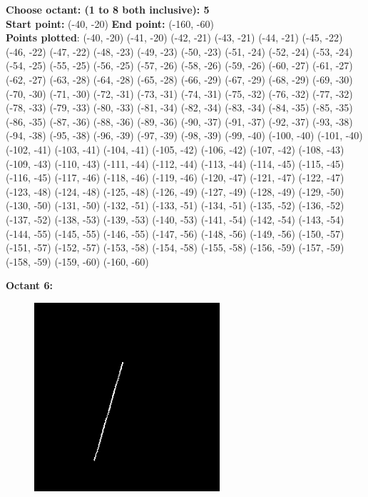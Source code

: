 \documentclass[12pt,letterpaper]{article}
\begin{document}
\textbf{Choose octant: (1 to 8 both inclusive): 5}\\
\textbf{Start point:} (-40, -20)
\textbf{End point:} (-160, -60)\\
\textbf{Points plotted}: 
(-40, -20) (-41, -20) (-42, -21) (-43, -21) 
(-44, -21) (-45, -22) (-46, -22) (-47, -22) 
(-48, -23) (-49, -23) (-50, -23) (-51, -24) 
(-52, -24) (-53, -24) (-54, -25) (-55, -25) 
(-56, -25) (-57, -26) (-58, -26) (-59, -26) 
(-60, -27) (-61, -27) (-62, -27) (-63, -28) 
(-64, -28) (-65, -28) (-66, -29) (-67, -29) 
(-68, -29) (-69, -30) (-70, -30) (-71, -30) 
(-72, -31) (-73, -31) (-74, -31) (-75, -32) 
(-76, -32) (-77, -32) (-78, -33) (-79, -33) 
(-80, -33) (-81, -34) (-82, -34) (-83, -34) 
(-84, -35) (-85, -35) (-86, -35) (-87, -36) 
(-88, -36) (-89, -36) (-90, -37) (-91, -37) 
(-92, -37) (-93, -38) (-94, -38) (-95, -38) 
(-96, -39) (-97, -39) (-98, -39) (-99, -40) 
(-100, -40) (-101, -40) (-102, -41) (-103, -41) 
(-104, -41) (-105, -42) (-106, -42) (-107, -42) 
(-108, -43) (-109, -43) (-110, -43) (-111, -44) 
(-112, -44) (-113, -44) (-114, -45) (-115, -45) 
(-116, -45) (-117, -46) (-118, -46) (-119, -46) 
(-120, -47) (-121, -47) (-122, -47) (-123, -48) 
(-124, -48) (-125, -48) (-126, -49) (-127, -49) 
(-128, -49) (-129, -50) (-130, -50) (-131, -50) 
(-132, -51) (-133, -51) (-134, -51) (-135, -52) 
(-136, -52) (-137, -52) (-138, -53) (-139, -53) 
(-140, -53) (-141, -54) (-142, -54) (-143, -54) 
(-144, -55) (-145, -55) (-146, -55) (-147, -56) 
(-148, -56) (-149, -56) (-150, -57) (-151, -57) 
(-152, -57) (-153, -58) (-154, -58) (-155, -58) 
(-156, -59) (-157, -59) (-158, -59) (-159, -60) 
(-160, -60)

\newpage
\textbf{Octant 6:}
\begin{figure}[h]
    \centering
    \includegraphics[height=7cm]{Outputs/O6.png}
\end{figure}
\end{document}
